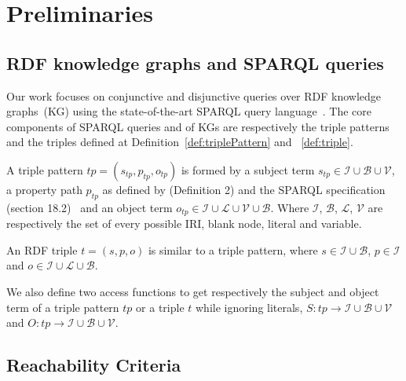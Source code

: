 \section{Preliminaries}

\subsection{RDF knowledge graphs and SPARQL queries}

Our work focuses on conjunctive and disjunctive queries over RDF knowledge graphs~(KG) using the state-of-the-art SPARQL query language~\cite{w3SPARQLQuery}.
The core components of SPARQL queries and of KGs are respectively the triple patterns and the triples defined at Definition~\ref{def:triplePattern} and ~\ref{def:triple}.

\begin{definition}\label{def:triplePattern}
    A triple pattern $tp = (s_{tp}, p_{tp}, o_{tp})$ is formed by a subject term $s_{tp} \in \mathcal{I} \cup \mathcal{B} \cup \mathcal{V}$, 
    a property path  $p_{tp}$ as defined by  \citeauthor{Kostylev2015} (Definition 2) and the SPARQL specification (section 18.2)~\cite{w3SPARQLQuery} 
    and an object term  $o_{tp} \in \mathcal{I} \cup \mathcal{L} \cup \mathcal{V} \cup \mathcal{B}$.
    Where $\mathcal{I}$, $\mathcal{B}$, $\mathcal{L}$, $\mathcal{V}$ are respectively the set of every possible IRI, blank node, literal and variable.
\end{definition}

\begin{definition}[Triple]\label{def:triple}
    An RDF triple $t = (s,p,o)$ is similar to a triple pattern, 
    where $s \in\mathcal{I} \cup \mathcal{B}$,
    $p \in \mathcal{I}$ and $o \in \mathcal{I} \cup \mathcal{L} \cup \mathcal{B}$.
\end{definition}

We also define two access functions to get respectively the subject and object term of a triple pattern $tp$ or a triple $t$ while ignoring literals,
$ S: tp \rightarrow \mathcal{I} \cup \mathcal{B} \cup \mathcal{V}$ and $O: tp \rightarrow \mathcal{I} \cup \mathcal{B} \cup \mathcal{V}$.

\subsection{Reachability Criteria}

